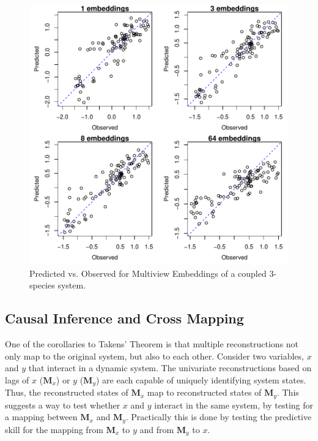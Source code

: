 \documentclass[article]{jss}
\begin{document}
\begin{figure}[t!]
\centering
\includegraphics[width=6in]{article-multiview}
\caption{\label{fig:multiview} Predicted vs. Observed for Multiview Embeddings of a coupled 3-species system.}
\end{figure}

\subsection{Causal Inference and Cross Mapping}\label{sec:causality}

One of the corollaries to Takens' Theorem is that multiple reconstructions not only map to the original system, but also to each other. Consider two variables, $x$ and $y$ that interact in a dynamic system. The univariate reconstructions based on lags of $x$ ($\mathbf{M}_x$) or $y$ ($\mathbf{M}_y$) are each capable of uniquely identifying system states. Thus, the reconstructed states of $\mathbf{M}_x$ map to reconstructed states of $\mathbf{M}_y$. This suggests a way to test whether $x$ and $y$ interact in the same system, by testing for a mapping between $\mathbf{M}_x$ and $\mathbf{M}_y$. Practically this is done by testing the predictive skill for the mapping from $\mathbf{M}_x$ to $y$ and from $\mathbf{M}_y$ to $x$.
\end{document}
